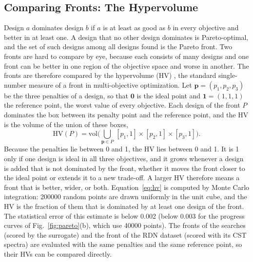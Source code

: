 \documentclass[journal]{IEEEtran}
\begin{document}
\subsection{Comparing Fronts: The Hypervolume}
Design $a$ dominates design $b$ if $a$ is at least as good as $b$ in every objective and better in at least one. A design that no other design dominates is Pareto-optimal, and the set of such designs among all designs found is the Pareto front. Two fronts are hard to compare by eye, because each consists of many designs and one front can be better in one region of the objective space and worse in another. The fronts are therefore compared by the hypervolume (HV) \cite{zitzler_hv}, the standard single-number measure of a front in multi-objective optimization. Let $\mathbf p=(p_1,p_2,p_3)$ be the three penalties of a design, so that $\mathbf 0$ is the ideal point and $\mathbf 1=(1,1,1)$ the reference point, the worst value of every objective. Each design of the front $P$ dominates the box between its penalty point and the reference point, and the HV is the volume of the union of these boxes,
\begin{equation}
\mathrm{HV}(P)=\mathrm{vol}\Big(\bigcup_{\mathbf p\in P}\,[p_1,1]\times[p_2,1]\times[p_3,1]\Big).
\label{eq:hv}
\end{equation}
Because the penalties lie between 0 and 1, the HV lies between 0 and 1. It is 1 only if one design is ideal in all three objectives, and it grows whenever a design is added that is not dominated by the front, whether it moves the front closer to the ideal point or extends it to a new trade-off. A larger HV therefore means a front that is better, wider, or both. Equation~\eqref{eq:hv} is computed by Monte Carlo integration: \num{200000} random points are drawn uniformly in the unit cube, and the HV is the fraction of them that is dominated by at least one design of the front. The statistical error of this estimate is below 0.002 (below 0.003 for the progress curves of Fig.~\ref{fig:pareto}(b), which use \num{40000} points). The fronts of the searches (scored by the surrogate) and the front of the RDN dataset (scored with its CST spectra) are evaluated with the same penalties and the same reference point, so their HVs can be compared directly.
\end{document}
